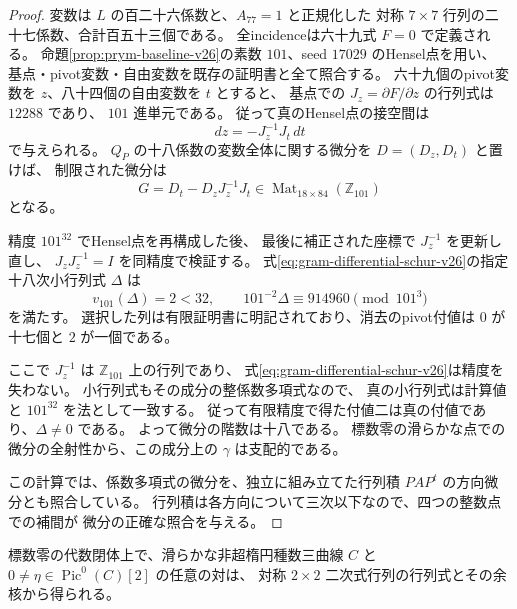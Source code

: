 \begin{proof}
変数は $L$ の百二十六係数と、$A_{77}=1$ と正規化した
対称 $7\times7$ 行列の二十七係数、合計百五十三個である。
全incidenceは六十九式 $F=0$ で定義される。
命題\ref{prop:prym-baseline-v26}の素数 $101$、seed $17029$ のHensel点を用い、
基点・pivot変数・自由変数を既存の証明書と全て照合する。
六十九個のpivot変数を $z$、八十四個の自由変数を $t$ とすると、
基点での $J_z=\partial F/\partial z$ の行列式は $12288$ であり、
$101$ 進単元である。
従って真のHensel点の接空間は
\[
 dz=-J_z^{-1}J_t\,dt
\]
で与えられる。
$Q_P$ の十八係数の変数全体に関する微分を $D=(D_z,D_t)$ と置けば、
制限された微分は
\begin{equation}\label{eq:gram-differential-schur-v26}
 G=D_t-D_zJ_z^{-1}J_t\in\operatorname{Mat}_{18\times84}(\mathbb Z_{101})
\end{equation}
となる。

精度 $101^{32}$ でHensel点を再構成した後、
最後に補正された座標で $J_z^{-1}$ を更新し直し、
$J_zJ_z^{-1}=I$ を同精度で検証する。
式\eqref{eq:gram-differential-schur-v26}の指定十八次小行列式 $\Delta$ は
\[
 v_{101}(\Delta)=2<32,
 \qquad 101^{-2}\Delta\equiv914960\pmod{101^3}
\]
を満たす。
選択した列は有限証明書に明記されており、消去のpivot付値は
$0$ が十七個と $2$ が一個である。

ここで $J_z^{-1}$ は $\mathbb Z_{101}$ 上の行列であり、
式\eqref{eq:gram-differential-schur-v26}は精度を失わない。
小行列式もその成分の整係数多項式なので、
真の小行列式は計算値と $101^{32}$ を法として一致する。
従って有限精度で得た付値二は真の付値であり、$\Delta\ne0$ である。
よって微分の階数は十八である。
標数零の滑らかな点での微分の全射性から、この成分上の $\gamma$ は支配的である。

この計算では、係数多項式の微分を、独立に組み立てた行列積
$PAP^t$ の方向微分とも照合している。
行列積は各方向について三次以下なので、四つの整数点での補間が
微分の正確な照合を与える。
\end{proof}

\begin{lemma}[四次曲線と二捩れ線束の二次式表示]
\label{lem:quartic-prym-representation-v26}
標数零の代数閉体上で、滑らかな非超楕円種数三曲線 $C$ と
$0\ne\eta\in\operatorname{Pic}^0(C)[2]$ の任意の対は、
対称 $2\times2$ 二次式行列の行列式とその余核から得られる。
\end{lemma}

